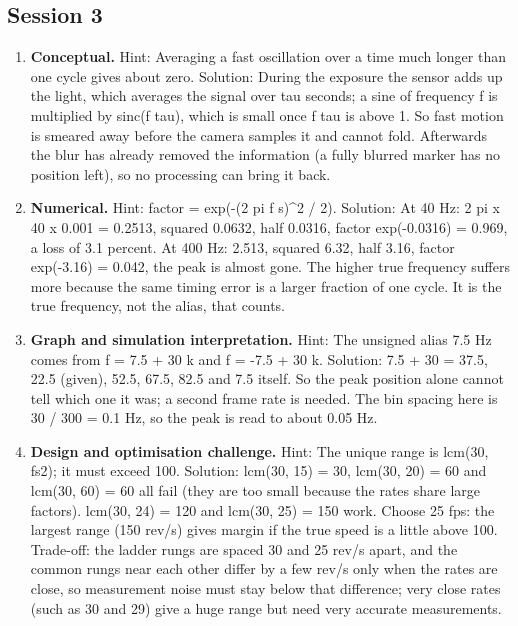 \documentclass[11pt,a4paper]{article}
\begin{document}
\subsection*{Session 3}
\begin{enumerate}[nosep]
\item \textbf{Conceptual.} Hint: Averaging a fast oscillation over a time much longer than one cycle gives about zero. Solution: During the exposure the sensor adds up the light, which averages the signal over tau seconds; a sine of frequency f is multiplied by \textbar{}sinc(f tau)\textbar{}, which is small once f tau is above 1. So fast motion is smeared away before the camera samples it and cannot fold. Afterwards the blur has already removed the information (a fully blurred marker has no position left), so no processing can bring it back.
\item \textbf{Numerical.} Hint: factor = exp(-(2 pi f s)\textasciicircum{}2 / 2). Solution: At 40 Hz: 2 pi x 40 x 0.001 = 0.2513, squared 0.0632, half 0.0316, factor exp(-0.0316) = 0.969, a loss of 3.1 percent. At 400 Hz: 2.513, squared 6.32, half 3.16, factor exp(-3.16) = 0.042, the peak is almost gone. The higher true frequency suffers more because the same timing error is a larger fraction of one cycle. It is the true frequency, not the alias, that counts.
\item \textbf{Graph and simulation interpretation.} Hint: The unsigned alias 7.5 Hz comes from f = 7.5 + 30 k and f = -7.5 + 30 k. Solution: 7.5 + 30 = 37.5, 22.5 (given), 52.5, 67.5, 82.5 and 7.5 itself. So the peak position alone cannot tell which one it was; a second frame rate is needed. The bin spacing here is 30 / 300 = 0.1 Hz, so the peak is read to about 0.05 Hz.
\item \textbf{Design and optimisation challenge.} Hint: The unique range is lcm(30, fs2); it must exceed 100. Solution: lcm(30, 15) = 30, lcm(30, 20) = 60 and lcm(30, 60) = 60 all fail (they are too small because the rates share large factors). lcm(30, 24) = 120 and lcm(30, 25) = 150 work. Choose 25 fps: the largest range (150 rev/s) gives margin if the true speed is a little above 100. Trade-off: the ladder rungs are spaced 30 and 25 rev/s apart, and the common rungs near each other differ by a few rev/s only when the rates are close, so measurement noise must stay below that difference; very close rates (such as 30 and 29) give a huge range but need very accurate measurements.
\end{enumerate}
\end{document}

